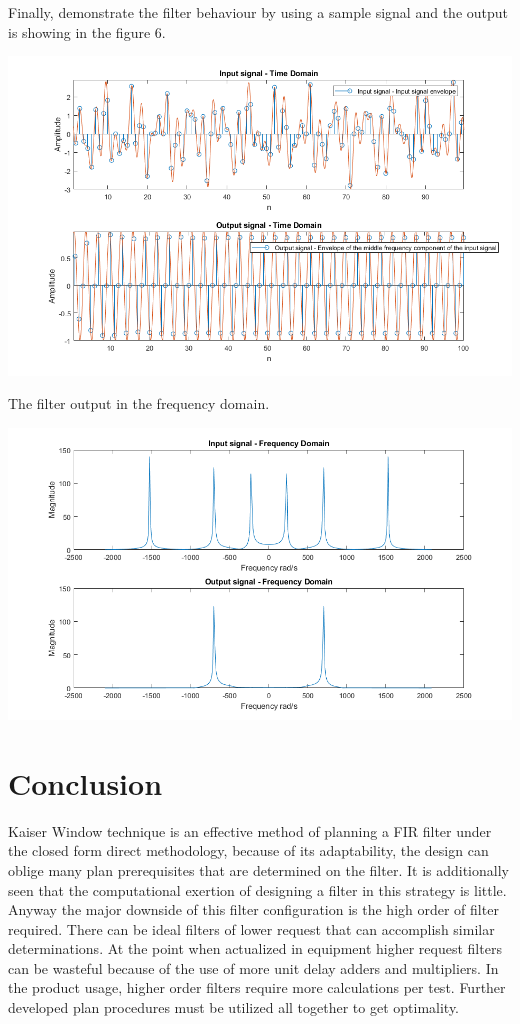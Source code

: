 \documentclass[oneside,11pt,onecolumn,a4paper]{report}
\begin{document}
Finally, demonstrate the filter behaviour by using a sample signal and the output is showing in the figure 6.

\includegraphics[scale=0.5]{Output}

The filter output in the frequency domain.


\includegraphics[scale=0.5]{Output_freq}



\pagebreak

\chapter{Conclusion}
\hspace{4em}Kaiser Window technique is an effective method of planning a FIR filter under the closed form direct methodology, because of its adaptability, the design can oblige many plan prerequisites that are determined on the filter. It  is additionally seen that the computational exertion of designing a filter in this strategy is little. Anyway the major downside of this filter configuration is the high order of filter required. There can be ideal filters of lower request that can accomplish similar determinations. At the point when actualized in equipment higher request filters can be wasteful because of the use of more unit delay adders and multipliers. In the product usage, higher order filters require more calculations per test. Further developed plan procedures must be utilized all together to get optimality.
\end{document}
